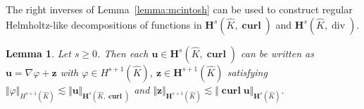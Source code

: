 \documentclass{article}
\newtheorem{lemma}[theorem]{Lemma}
\begin{document}
The right inverses of Lemma~\ref{lemma:mcintosh} can be used to construct regular 
Helmholtz-like decompositions of functions in ${\mathbf{H}}^{s}(\widehat{K},\operatorname*{\mathbf{curl}})$ and ${\mathbf{H}}^{s}(\widehat{K},\operatorname*{div})$.

\begin{lemma}
\label{lemma:helmholtz-like-decomp} Let $s \ge0$. Then each ${\mathbf{u}}
\in{\mathbf{H}}^{s}(\widehat{K},\operatorname*{\mathbf{curl}})$ can be written as
${\mathbf{u}} = \nabla\varphi+ {\mathbf{z}}$ with $\varphi\in H^{s+1}%
(\widehat{K})$, ${\mathbf{z}} \in{\mathbf{H}}^{s+1}(\widehat{K})$ satisfying $\Vert\varphi\Vert_{H^{s+1}(\widehat{K})} \lesssim \Vert\mathbf{u}\Vert_{\mathbf{H}^s(\widehat{K},\operatorname{\mathbf{curl}})}$ and $\Vert\mathbf{z}\Vert_{\mathbf{H}^{s+1}(\widehat{K})} \lesssim \Vert\operatorname{\mathbf{curl}}\mathbf{u}\Vert_{\mathbf{H}^s(\widehat{K})}$.
\end{lemma}
\end{document}
